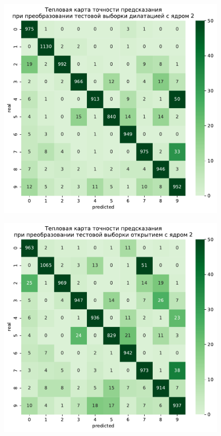 \documentclass{article}
\begin{document}
\newpage
\begin{figure}[h]	
	\subfigure
	{
	    \begin{minipage}{8cm}
	        \centering
	        \includegraphics[scale=0.35]{TASK1 test morf2.pdf}
	    \end{minipage}
	    \label{app6:morf2}
	}
	\subfigure
	{
		\begin{minipage}{8cm}
			\centering
			\includegraphics[scale=0.35]{TASK1 test morf3.pdf}

\end{minipage}}
\end{figure}
\end{document}
